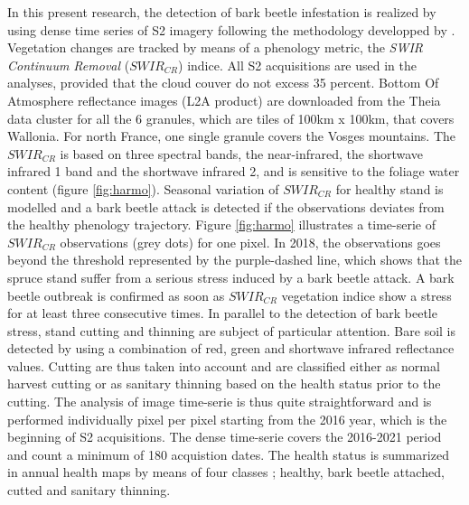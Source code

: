 \documentclass[3p,procedia]{elsarticle}
\begin{document}
In this present research, the detection of bark beetle infestation is realized by using dense time series of S2 imagery following the methodology developped by \cite{dutrieux_package_2021}.
Vegetation changes are tracked by means of a phenology metric, the \textit{SWIR Continuum Removal} ($SWIR_{CR}$) indice.
All S2 acquisitions are used in the analyses, provided that the cloud couver do not excess 35 percent.  Bottom Of Atmosphere reflectance images (L2A product) are downloaded from the Theia data cluster \citep{theia_team} for all the 6 granules, which are tiles of 100km x 100km, that covers Wallonia. 
For north France, one single granule covers the Vosges mountains.
The $SWIR_{CR}$ is based on three spectral bands, the near-infrared, the shortwave infrared 1 band and the shortwave infrared 2, and is sensitive to the foliage water content (figure \ref{fig:harmo}).
Seasonal variation of $SWIR_{CR}$ for healthy stand is modelled and a bark beetle attack is detected if the observations deviates from the healthy phenology trajectory. 
Figure \ref{fig:harmo} illustrates a time-serie of $SWIR_{CR}$ observations (grey dots) for one pixel. 
In 2018, the observations goes beyond the threshold represented by the purple-dashed line, which shows that the spruce stand suffer from a serious stress induced by a bark beetle attack.
A bark beetle outbreak is confirmed as soon as $SWIR_{CR}$ vegetation indice show a stress for at least three consecutive times.
In parallel to the detection of bark beetle stress, stand cutting and thinning are subject of particular attention. 
Bare soil is detected by using a combination of red, green and shortwave infrared reflectance values.
Cutting are thus taken into account and are classified either as normal harvest cutting or as sanitary thinning based on the health status prior to the cutting.
The analysis of image time-serie is thus quite straightforward and is performed individually pixel per pixel starting from the 2016 year, which is the beginning of S2 acquisitions. 
The dense time-serie covers the 2016-2021 period and count a minimum of 180 acquistion dates. 
The health status is summarized in annual health maps by means of four classes ; healthy, bark beetle attached, cutted and sanitary thinning.
\end{document}
